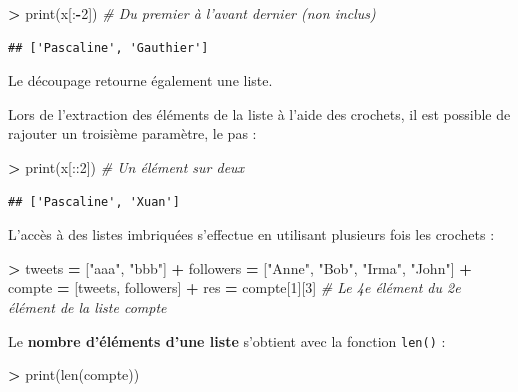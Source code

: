 \documentclass[12pt,]{book}
\newenvironment{Shaded}{\begin{snugshade}}{\end{snugshade}}
\newcommand{\DecValTok}[1]{\textcolor[rgb]{0.00,0.00,0.81}{#1}}
\newcommand{\StringTok}[1]{\textcolor[rgb]{0.31,0.60,0.02}{#1}}
\newcommand{\CommentTok}[1]{\textcolor[rgb]{0.56,0.35,0.01}{\textit{#1}}}
\newcommand{\OperatorTok}[1]{\textcolor[rgb]{0.81,0.36,0.00}{\textbf{#1}}}
\newcommand{\BuiltInTok}[1]{#1}
\newcommand{\NormalTok}[1]{#1}
\numberwithin{equation}{section}
\numberwithin{countremarque}{section}
\let\BeginKnitrBlock\begin \let\EndKnitrBlock\end
\begin{document}
\begin{Shaded}
\begin{Highlighting}[]
\OperatorTok{>} \BuiltInTok{print}\NormalTok{(x[:}\OperatorTok{-}\DecValTok{2}\NormalTok{]) }\CommentTok{# Du premier à l'avant dernier (non inclus)}
\end{Highlighting}
\end{Shaded}

\begin{lstlisting}
## ['Pascaline', 'Gauthier']
\end{lstlisting}

\BeginKnitrBlock{remarque}
Le découpage retourne également une liste.
\EndKnitrBlock{remarque}

Lors de l'extraction des éléments de la liste à l'aide des crochets, il
est possible de rajouter un troisième paramètre, le pas :

\begin{Shaded}
\begin{Highlighting}[]
\OperatorTok{>} \BuiltInTok{print}\NormalTok{(x[::}\DecValTok{2}\NormalTok{]) }\CommentTok{# Un élément sur deux}
\end{Highlighting}
\end{Shaded}

\begin{lstlisting}
## ['Pascaline', 'Xuan']
\end{lstlisting}

L'accès à des listes imbriquées s'effectue en utilisant plusieurs fois
les crochets :

\begin{Shaded}
\begin{Highlighting}[]
\OperatorTok{>}\NormalTok{ tweets }\OperatorTok{=}\NormalTok{ [}\StringTok{"aaa"}\NormalTok{, }\StringTok{"bbb"}\NormalTok{]}
\OperatorTok{+}\NormalTok{ followers }\OperatorTok{=}\NormalTok{ [}\StringTok{"Anne"}\NormalTok{, }\StringTok{"Bob"}\NormalTok{, }\StringTok{"Irma"}\NormalTok{, }\StringTok{"John"}\NormalTok{]}
\OperatorTok{+}\NormalTok{ compte }\OperatorTok{=}\NormalTok{ [tweets, followers]}
\OperatorTok{+}\NormalTok{ res }\OperatorTok{=}\NormalTok{ compte[}\DecValTok{1}\NormalTok{][}\DecValTok{3}\NormalTok{] }\CommentTok{# Le 4e élément du 2e élément de la liste compte}
\end{Highlighting}
\end{Shaded}

Le \textbf{nombre d'éléments d'une liste} s'obtient avec la fonction
\texttt{len()} :

\begin{Shaded}
\begin{Highlighting}[]
\OperatorTok{>} \BuiltInTok{print}\NormalTok{(}\BuiltInTok{len}\NormalTok{(compte))}
\end{Highlighting}
\end{Shaded}
\end{document}

